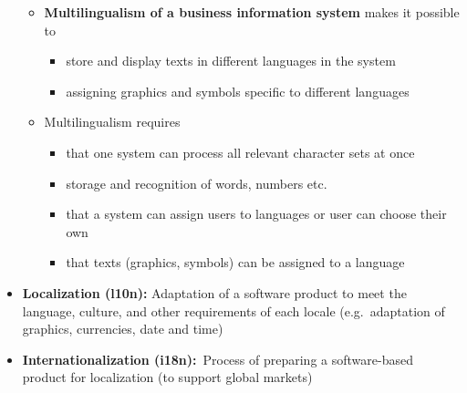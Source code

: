 \documentclass[ieeetran]{article}
\begin{document}
\begin{itemize}
	\begin{itemize}
	\item \textbf{Multilingualism of a business information system} makes it possible to
		\begin{itemize}
		  \item store and display texts in different languages in the system
		\item assigning graphics and symbols specific to different languages 
		\end{itemize}
	
\item Multilingualism requires
	\begin{itemize}

\item that one system can process all relevant character sets at once
	\item storage and recognition of words, numbers etc.
	\item that a system can assign users to languages or user can choose their own
	\item that texts (graphics, symbols) can be assigned to a language
	\end{itemize}
	\end{itemize}
\item \textbf{Localization (l10n):} Adaptation of a software product to meet the language, culture, and other requirements of each locale (e.g.\ adaptation of graphics, currencies, date and time)
\item \textbf{Internationalization (i18n):}\ Process of preparing a software-based product for localization (to support global markets)
\end{itemize}
\end{document}
